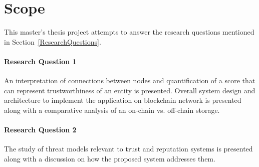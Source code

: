 \section{Scope} 
This master's thesis project attempts to answer the research questions
mentioned in Section~\ref{ResearchQuestions}.  

\paragraph{Research Question 1 } 
An interpretation of connections between nodes and quantification of a score
that can represent trustworthiness of an entity is presented. Overall system
design and architecture to implement the application on blockchain network is
presented along with a comparative analysis of an on-chain vs. off-chain
storage.

\paragraph{Research Question 2} 
The study of threat models relevant to trust and reputation systems is
presented along with a discussion on how the proposed system addresses them. 
%


